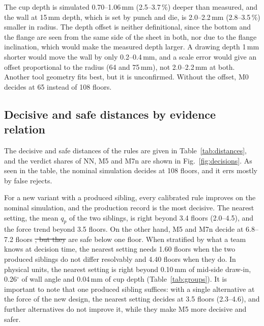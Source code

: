 \documentclass[pdflatex,sn-basic,lineno]{sn-jnl}
\providecommand{\DIFadd}[1]{{\protect\color{blue}\uwave{#1}}} %
\providecommand{\DIFdel}[1]{{\protect\color{red}\sout{#1}}}                      %
\providecommand{\DIFaddbegin}{} %
\providecommand{\DIFaddend}{} %
\providecommand{\DIFdelbegin}{} %
\providecommand{\DIFdelend}{} %
\newcommand{\DIFscaledelfig}{0.5}
\newlength{\DIFdelgraphicswidth} %
\newlength{\DIFdelgraphicsheight} %
\newcommand{\DIFaddincludegraphics}[2][]{{\color{blue}\fbox{\DIFOincludegraphics[#1]{#2}}}} %
\newcommand{\DIFdelincludegraphics}[2][]{%
\sbox{\DIFdelgraphicsbox}{\DIFOincludegraphics[#1]{#2}}%
\settoboxwidth{\DIFdelgraphicswidth}{\DIFdelgraphicsbox} %
\settoboxtotalheight{\DIFdelgraphicsheight}{\DIFdelgraphicsbox} %
\scalebox{\DIFscaledelfig}{%
\parbox[b]{\DIFdelgraphicswidth}{\usebox{\DIFdelgraphicsbox}\\[-\baselineskip] \rule{\DIFdelgraphicswidth}{0em}}\llap{\resizebox{\DIFdelgraphicswidth}{\DIFdelgraphicsheight}{%
\setlength{\unitlength}{\DIFdelgraphicswidth}%
\begin{picture}(1,1)%
\thicklines\linethickness{2pt} %
{\color[rgb]{1,0,0}\put(0,0){\framebox(1,1){}}}%
{\color[rgb]{1,0,0}\put(0,0){\line( 1,1){1}}}%
{\color[rgb]{1,0,0}\put(0,1){\line(1,-1){1}}}%
\end{picture}%
}\hspace*{3pt}}} %
} %
\DeclareRobustCommand{\DIFaddbegin}{\DIFOaddbegin \let\includegraphics\DIFaddincludegraphics} %
\DeclareRobustCommand{\DIFaddend}{\DIFOaddend \let\includegraphics\DIFOincludegraphics} %
\DeclareRobustCommand{\DIFdelbegin}{\DIFOdelbegin \let\includegraphics\DIFdelincludegraphics} %
\DeclareRobustCommand{\DIFdelend}{\DIFOaddend \let\includegraphics\DIFOincludegraphics} %
\begin{document}
The cup depth is simulated 0.70--1.06\,mm (2.5--3.7\,\%) deeper than measured, and the wall at 15\,mm depth, which is set by punch and die, is 2.0--2.2\,mm (2.8--3.5\,\%) smaller in radius. The depth offset is neither definitional, since the bottom and the flange are seen from the same side of the sheet in both, nor due to the flange inclination, which would make the measured depth larger. A drawing depth 1\,mm shorter would move the wall by only 0.2--0.4\,mm, and a scale error would give an offset proportional to the radius (64 and 75\,mm), not 2.0--2.2\,mm at both. Another tool geometry fits best, but it is unconfirmed. Without the offset, M0 decides at 65 instead of 108 floors.

\subsection{Decisive and safe distances by evidence relation}\label{sec:res-decisions}

The decisive and safe distances of the rules are given in Table~\ref{tab:distances}, and the verdict shares of NN, M5 and M7n are shown in Fig.~\ref{fig:decisions}. As seen in the table, the nominal simulation decides at 108 floors, and it errs mostly by false rejects.

For a new variant with a produced sibling, every calibrated rule improves on the nominal simulation, and the production record is the most decisive. The nearest setting, the mean $q_p$ of the two siblings, is right beyond 3.4 floors (2.0--4.5), and the force trend beyond 3.5 floors. On the other hand, M5 and M7n decide \DIFaddbegin \DIFadd{only }\DIFaddend at 6.8--7.2 floors \DIFdelbegin \DIFdel{, but they }\DIFdelend \DIFaddbegin \DIFadd{but }\DIFaddend are safe below one floor. When stratified by what a team knows at decision time, the nearest setting needs 1.60 floors when the two produced siblings do not differ resolvably and 4.40 floors when they do. In physical units, the nearest setting is right beyond 0.10\,mm of mid-side draw-in, 0.26$^\circ$ of wall angle and 0.04\,mm of cup depth (Table~\ref{tab:groups}). It is important to note that one produced sibling suffices: with a single alternative at the force of the new design, the nearest setting decides at 3.5 floors (2.3--4.6), and further alternatives do not improve it, while they make M5 more decisive and safer.
\end{document}
